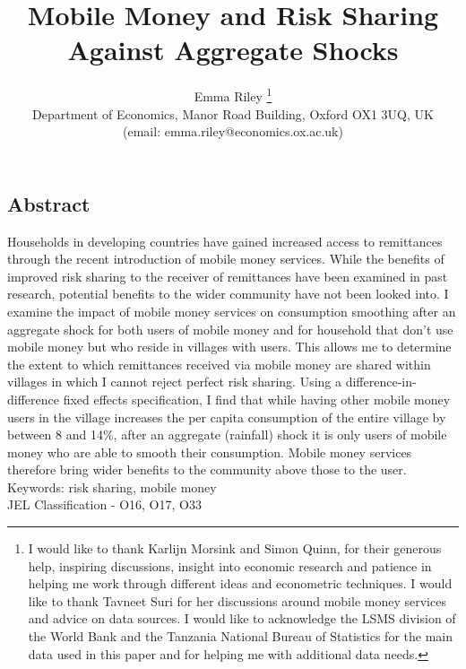 \documentclass[a4paper]{article}
\begin{document}
\begin{titlepage}
\title{Mobile Money and Risk Sharing Against Aggregate Shocks}
\author{Emma Riley \footnote{I would like to thank  Karlijn Morsink and Simon Quinn, for their generous help, inspiring discussions, insight into economic research and patience in helping me work through different ideas and econometric techniques. I would like to thank Tavneet Suri for her discussions around mobile money services and advice on data sources. I would like to acknowledge the LSMS division of the World Bank and the Tanzania National Bureau of Statistics for the main data used in this paper and for helping me with additional data needs.} \\ Department of Economics, Manor Road Building, Oxford OX1 3UQ, UK \\ (email: emma.riley@economics.ox.ac.uk)}
\thispagestyle{empty}
\maketitle 
\begin{center}
\section*{Abstract}
\end{center}

Households in developing countries have gained increased access to remittances through the recent introduction of mobile money services. While the benefits of improved risk sharing to the receiver of remittances have been examined in past research, potential benefits to the wider community have not been looked into. I examine the impact of mobile money services on consumption smoothing after an aggregate shock for both users of mobile money and for household that don't use mobile money but who reside in villages with users. This allows me to determine the extent to which remittances received via mobile money are shared within villages in which I cannot reject perfect risk sharing. Using a difference-in-difference fixed effects specification, I find that while having other mobile money users in the village increases the per capita consumption of the entire village by between  8 and 14\%, after an aggregate (rainfall) shock it is only users of mobile money who are able to smooth their consumption. Mobile money services therefore bring wider benefits to the community above those to the user. \\

\noindent Keywords: risk sharing, mobile money \\
JEL Classification - O16, O17, O33
\thispagestyle{empty}



\end{titlepage}
\end{document}
